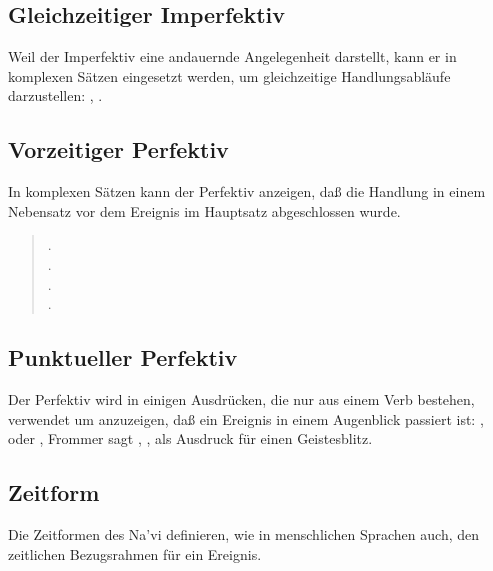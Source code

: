 \subsection{Gleichzeitiger Imperfektiv} Weil der Imperfektiv eine andauernde Angelegenheit
darstellt, kann er in komplexen S\"atzen eingesetzt werden, um gleichzeitige
Handlungsabl\"aufe darzustellen: ,
.

\subsection{Vorzeitiger Perfektiv} In komplexen S\"atzen kann der Perfektiv anzeigen, da\ss{}
die Handlung in einem Nebensatz vor dem Ereignis im Hauptsatz abgeschlossen wurde.

\begin{quotation}
\noindent{}.\\
\indent{}.\\

\noindent{}.\\
\indent{}.
\end{quotation}

\subsection{Punktueller Perfektiv} Der Perfektiv wird in einigen Ausdr\"ucken, die nur aus
einem Verb bestehen, verwendet um anzuzeigen, da\ss{} ein Ereignis in einem Augenblick
passiert ist: ,  oder , 
Frommer sagt , , als Ausdruck f\"ur einen Geistesblitz.

\subsection{Zeitform} Die Zeitformen des Na’vi definieren, wie in menschlichen Sprachen auch,
den zeitlichen Bezugsrahmen f\"ur ein Ereignis.


